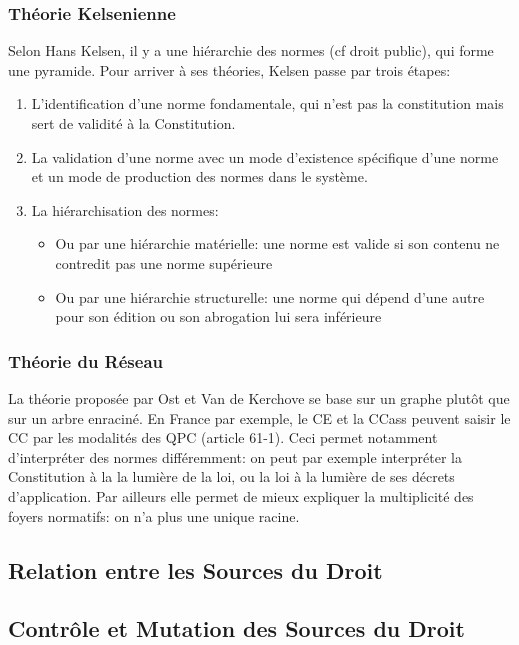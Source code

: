 \documentclass[math]{cours}
\begin{document}
\subsubsection{Théorie Kelsenienne}
Selon Hans Kelsen, il y a une hiérarchie des normes (cf droit public), qui forme une pyramide.
Pour arriver à ses théories, Kelsen passe par trois étapes:
\begin{enumerate}
	\item L'identification d'une norme fondamentale, qui n'est pas la constitution mais sert de validité à la Constitution.
	\item La validation d'une norme avec un mode d'existence spécifique d'une norme et un mode de production des normes dans le système.
	\item La hiérarchisation des normes:
		\begin{itemize}
			\item Ou par une hiérarchie matérielle: une norme est valide si son contenu ne contredit pas une norme supérieure
			\item Ou par une hiérarchie structurelle: une norme qui dépend d'une autre pour son édition ou son abrogation lui sera inférieure
		\end{itemize}
\end{enumerate}

\subsubsection{Théorie du Réseau}
La théorie proposée par Ost et Van de Kerchove se base sur un graphe plutôt que sur un arbre enraciné.
En France par exemple, le CE et la CCass peuvent saisir le CC par les modalités des QPC (article 61-1).
Ceci permet notamment d'interpréter des normes différemment: on peut par exemple interpréter la Constitution à la la lumière de la loi, ou la loi à la lumière de ses décrets d'application.
Par ailleurs elle permet de mieux expliquer la multiplicité des foyers normatifs: on n'a plus une unique racine.


\subsection{Relation entre les Sources du Droit}

\subsection{Contrôle et Mutation des Sources du Droit}
\end{document}
